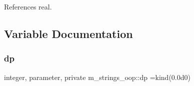 References real.



\subsection{Variable Documentation}
\mbox{\label{namespacem__strings__oop_aff89e0d0502f39fedc4f8a9cf793fdba}} 
\subsubsection{\texorpdfstring{dp}{dp}}
{\footnotesize\ttfamily integer, parameter, private m\+\_\+strings\+\_\+oop\+::dp =kind(0.\+0d0)\hspace{0.3cm}{\ttfamily [private]}}

